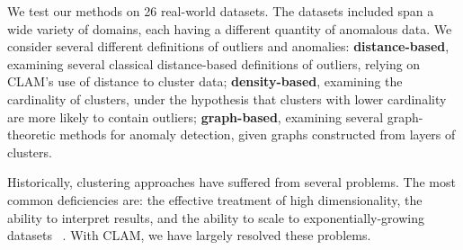 We test our methods on 26 real-world datasets. 
The datasets included span a wide variety of domains, each having a different quantity of anomalous data.
We consider several different definitions of outliers and anomalies: \textbf{distance-based}, examining several classical distance-based definitions of outliers, relying on CLAM's use of distance to cluster data; \textbf{density-based}, examining the cardinality of clusters, under the hypothesis that clusters with lower cardinality are more likely to contain outliers; \textbf{graph-based}, examining several graph-theoretic methods for anomaly detection, given graphs constructed from layers of clusters.

Historically, clustering approaches have suffered from several problems.
The most common deficiencies are: the effective treatment of high dimensionality, the ability to interpret results, and the ability to scale to exponentially-growing datasets ~\cite{agrawal1998automatic}.
With CLAM, we have largely resolved these problems.
